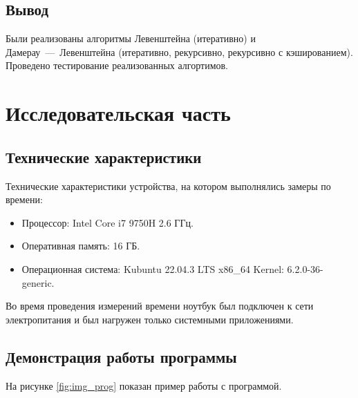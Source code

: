 \section*{Вывод}

Были реализованы алгоритмы Левенштейна (итеративно) и Дамерау~---~Левенштейна (итеративно, рекурсивно, рекурсивно с кэшированием).
Проведено тестирование реализованных алгортимов.

\clearpage

\chapter{Исследовательская часть}

\section{Технические характеристики}
Технические характеристики устройства, на котором выполнялись
замеры по времени:

\begin{itemize}
    \item Процессор: Intel Core i7 9750H 2.6 ГГц.
    \item Оперативная память: 16 ГБ.
    \item Операционная система: Kubuntu 22.04.3 LTS x86\_64 Kernel: 6.2.0-36-generic.
\end{itemize}

Во время проведения измерений времени ноутбук был подключен к сети электропитания и был нагружен только системными приложениями.

\section{Демонстрация работы программы}

На рисунке \ref{fig:img_prog} показан пример работы с программой.


